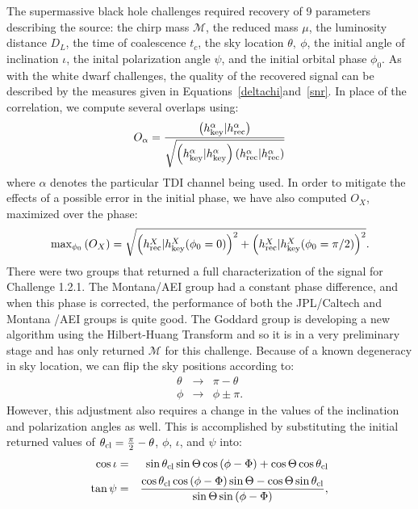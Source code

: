 \documentclass[12pt]{iopart}
\begin{document}
The supermassive black hole challenges required recovery of 9 parameters describing the source: the chirp mass $\mathcal{M}$, the reduced mass $\mu$, the luminosity distance $D_L$, the time of coalescence $t_c$, the sky location $\theta,~\phi$, the initial angle of inclination $\iota$, the inital polarization angle $\psi$, and the initial orbital phase $\phi_0$. As with the white dwarf challenges, the quality of the recovered signal can be described by the measures given in Equations~\ref{deltachi}and~\ref{snr}. In place of the correlation, we compute several overlaps using:
\begin{equation}
\label{overlaps}
O_{\alpha} = \frac{\left(h^{\alpha}_{\rm key}|h^{\alpha}_{\rm rec}\right)}{\sqrt{\left(h^{\alpha}_{\rm key}|h^{\alpha}_{\rm key}\right)\left(h^{\alpha}_{\rm rec}|h^{\alpha}_{\rm rec}\right)}}
\end{equation}
where $\alpha$ denotes the particular TDI channel being used. In order to mitigate the effects of a possible error in the initial phase, we have also computed $O_X$, maximized over the phase:
\begin{equation}
\label{maxphi}
{\rm max}_{\phi_0}\left(O_X\right) = \sqrt{\left(h^{X}_{\rm rec}|h^{X}_{\rm key}(\phi_0=0)\right)^2+\left(h^{X}_{\rm rec}|h^{X}_{\rm key}(\phi_0=\pi/2)\right)^2}.
\end{equation}
There were two groups that returned a full characterization of the signal for Challenge 1.2.1. The Montana/AEI group had a constant phase difference, and when this phase is corrected, the performance of both the JPL/Caltech and Montana /AEI groups is quite good. The Goddard group is developing a new algorithm using the Hilbert-Huang Transform and so it is in a very preliminary stage and has only returned $\mathcal{M}$ for this challenge. Because of a known degeneracy in sky location, we can flip the sky positions according to:
\begin{eqnarray}
\theta & \rightarrow & \pi - \theta \label{skyflip1} \\
\phi & \rightarrow & \phi \pm \pi. \label{skyflip2}
\end{eqnarray}
However, this adjustment also requires a change in the values of the inclination and polarization angles as well. This is accomplished by substituting the initial returned values of $\theta_{\rm cl} = \frac{\pi}{2} - \theta$, $\phi$, $\iota$, and $\psi$ into:
\begin{eqnarray}
\cos{\iota} & = & \sin{\theta_{\rm cl}}\sin{\Theta}\cos{\left(\phi - \Phi\right)} + \cos{\Theta}\cos{\theta_{\rm cl}} \label{iota} \\
\tan{\psi} & = & \frac{\cos{\theta_{\rm cl}}\cos{\left(\phi - \Phi\right)}\sin{\Theta} - \cos{\Theta}\sin{\theta_{\rm cl}}}{\sin{\Theta}\sin{\left(\phi - \Phi\right)}}, \label{psi}
\end{eqnarray}
\end{document}
